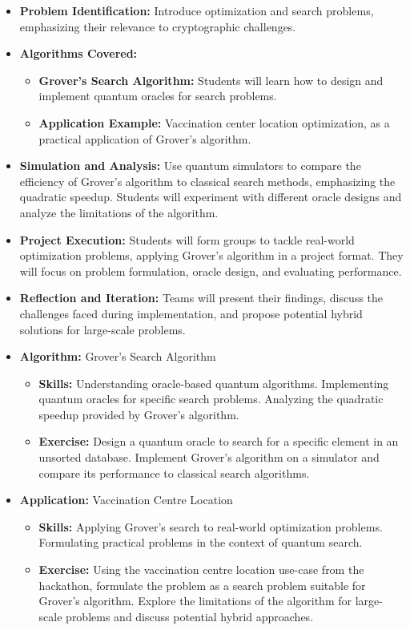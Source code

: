 \begin{itemize}
    \item \textbf{Problem Identification:} Introduce optimization and search problems, emphasizing their relevance to cryptographic challenges.
    \item \textbf{Algorithms Covered:}
    \begin{itemize}
        \item \textbf{Grover’s Search Algorithm:} Students will learn how to design and implement quantum oracles for search problems.
        \item \textbf{Application Example:} Vaccination center location optimization, as a practical application of Grover’s algorithm.
    \end{itemize}
    \item \textbf{Simulation and Analysis:} Use quantum simulators to compare the efficiency of Grover’s algorithm to classical search methods, emphasizing the quadratic speedup. Students will experiment with different oracle designs and analyze the limitations of the algorithm.
    \item \textbf{Project Execution:} Students will form groups to tackle real-world optimization problems, applying Grover’s algorithm in a project format. They will focus on problem formulation, oracle design, and evaluating performance.
    \item \textbf{Reflection and Iteration:} Teams will present their findings, discuss the challenges faced during implementation, and propose potential hybrid solutions for large-scale problems.
\end{itemize}


\begin{itemize}
    \item \textbf{Algorithm:} Grover's Search Algorithm
    \begin{itemize}
        \item \textbf{Skills:} Understanding oracle-based quantum algorithms. Implementing quantum oracles for specific search problems. Analyzing the quadratic speedup provided by Grover's algorithm.
        \item \textbf{Exercise:} Design a quantum oracle to search for a specific element in an unsorted database. Implement Grover's algorithm on a simulator and compare its performance to classical search algorithms.
    \end{itemize}
    
    \item \textbf{Application:} Vaccination Centre Location
    \begin{itemize}
        \item \textbf{Skills:} Applying Grover's search to real-world optimization problems. Formulating practical problems in the context of quantum search.
        \item \textbf{Exercise:} Using the vaccination centre location use-case from the hackathon, formulate the problem as a search problem suitable for Grover's algorithm. Explore the limitations of the algorithm for large-scale problems and discuss potential hybrid approaches.
    \end{itemize}
\end{itemize}

